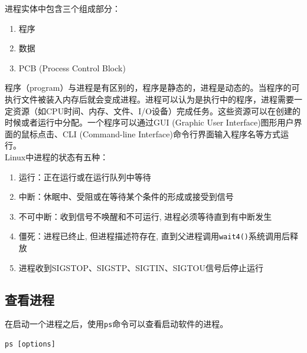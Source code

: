 \documentclass[12pt, openany, oneside]{book}
\begin{document}
进程实体中包含三个组成部分：

\begin{enumerate}
    \item 程序
    \item 数据
    \item PCB (Process Control Block)
\end{enumerate}

程序（program）与进程是有区别的，程序是静态的，进程是动态的。当程序的可执行文件被装入内存后就会变成进程。进程可以认为是执行中的程序，进程需要一定资源（如CPU时间、内存、文件、I/O设备）完成任务。这些资源可以在创建的时候或者运行中分配。一个程序可以通过GUI (Graphic User Interface)图形用户界面的鼠标点击、CLI (Command-line Interface)命令行界面输入程序名等方式运行。 \\

Linux中进程的状态有五种：

\begin{enumerate}
    \item 运行：正在运行或在运行队列中等待

    \item 中断：休眠中、受阻或在等待某个条件的形成或接受到信号

    \item 不可中断：收到信号不唤醒和不可运行, 进程必须等待直到有中断发生

    \item 僵死：进程已终止, 但进程描述符存在, 直到父进程调用\lstinline|wait4()|系统调用后释放

    \item 进程收到SIGSTOP、SIGSTP、SIGTIN、SIGTOU信号后停止运行
\end{enumerate}

\subsection{查看进程}

在启动一个进程之后，使用\lstinline|ps|命令可以查看启动软件的进程。

\vspace{-0.5cm}
\begin{lstlisting}
ps [options]
\end{lstlisting}
\end{document}
